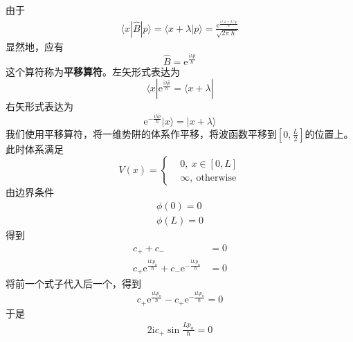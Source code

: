         由于
        \begin{equation}\begin{aligned}
            \langle x|\hat{B}| p \rangle = \langle x+\lambda |p\rangle = \frac {\mathrm{e}^{\frac {\mathrm{i}(x+\lambda)p}{\hslash}}}{\sqrt{2\pi\hslash}}
        \end{aligned}\end{equation}
        显然地，应有
        \begin{equation}
            \hat{B} = \mathrm{e}^{\frac {\mathrm{i}\lambda \hat{p}}{\hslash}}
        \end{equation}
        这个算符称为\textbf{平移算符}。左矢形式表达为
        \[ \langle x| \mathrm{e}^{\frac {\mathrm{i}\lambda \hat{p}}{\hslash}} = \langle x+\lambda| \]
        右矢形式表达为
        \[ \mathrm{e}^{-\frac {\mathrm{i}\lambda \hat{p}}{\hslash}} | x\rangle = |x+\lambda \rangle \]
        我们使用平移算符，将一维势阱的体系作平移，将波函数平移到$[0,\frac L2]$的位置上。此时体系满足
        \begin{equation}
            V(x) = \left \{
                \begin{aligned}
                    &0,\ x\in [0, L]\\
                    &\infty, \ \mathrm{otherwise}
                \end{aligned}
                \right.
        \end{equation}
        由边界条件
        \begin{equation}\begin{aligned}
            \phi(0)= 0\\
            \phi(L) = 0
        \end{aligned}\end{equation}
        得到
        \begin{equation}\begin{aligned}
            c_+ +c_- &= 0\\
            c_+\mathrm{e}^{\frac {\mathrm{i}Lp_n}{\hslash}}+c_-\mathrm{e}^{-\frac {\mathrm{i}Lp_n}{\hslash}} &= 0
        \end{aligned}\end{equation}
        将前一个式子代入后一个，得到
        \[ c_+\mathrm{e}^{\frac {\mathrm{i}Lp_n}{\hslash}}-c_+ \mathrm{e}^{-\frac {\mathrm{i}Lp_n}{\hslash}} = 0 \]
        于是
        \begin{equation}\begin{aligned}
            2\mathrm{i}c_+ \sin{\frac {Lp_n}{\hslash}} = 0
        \end{aligned}\end{equation}
